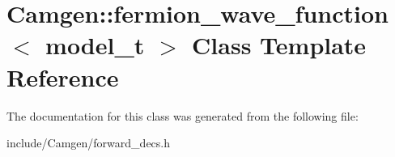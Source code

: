 \hypertarget{a00224}{}\section{Camgen\+:\+:fermion\+\_\+wave\+\_\+function$<$ model\+\_\+t $>$ Class Template Reference}
\label{a00224}


The documentation for this class was generated from the following file\+:\begin{DoxyCompactItemize}
\item 
include/\+Camgen/forward\+\_\+decs.\+h\end{DoxyCompactItemize}
